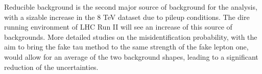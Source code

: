 Reducible background is the second major source of background for the analysis, with a sizable increase in the 8 TeV dataset due to pileup conditions. The dire running environment of LHC Run II will see an increase of this source of backgrounds. More detailed studies on the misidentification probability, with the aim to bring the fake tau method to the same strength of the fake lepton one, would allow for an average of the two background shapes, leading to a significant reduction of the uncertainties.
